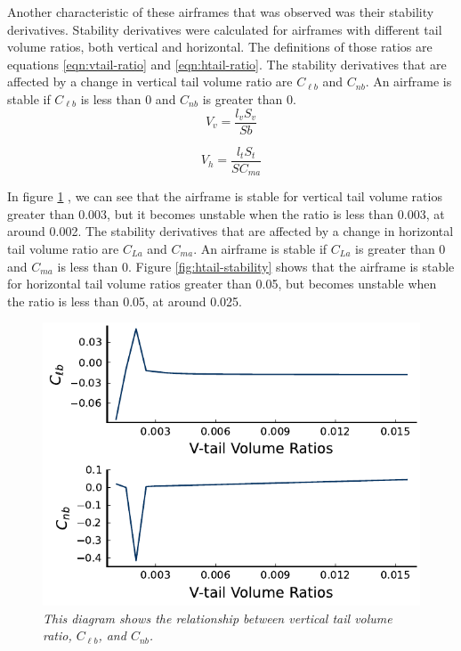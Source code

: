 \documentclass{journal}
\begin{document}
	Another characteristic of these airframes that was observed was their stability derivatives. Stability derivatives were calculated for airframes with different tail volume ratios, both vertical and horizontal. The definitions of those ratios are equations \ref{eqn:vtail-ratio} and \ref{eqn:htail-ratio}. The stability derivatives that are affected by a change in vertical tail volume ratio are \(C_{\ell{b}}\) and \(C_{nb}\). An airframe is stable if \(C_{\ell{b}}\) is less than 0 and \(C_{nb}\) is greater than 0. \\
	
	\begin{equation}
		V_v = \frac{l_vS_v}{Sb}
		\label{eqn:vtail-ratio}
	\end{equation}
	
	\begin{equation}
		V_h = \frac{l_tS_t}{SC_{ma}}
		\label{eqn:htail-ratio}
	\end{equation}

	In figure \ref{fig:vtail-stability} , we can see that the airframe is stable for vertical tail volume ratios greater than 0.003, but it becomes unstable when the ratio is less than 0.003, at around 0.002. The stability derivatives that are affected by a change in horizontal tail volume ratio are \(C_{La}\) and \(C_{ma}\). An airframe is stable if \(C_{La}\) is greater than 0 and \(C_{ma}\) is less than 0. Figure \ref{fig:htail-stability} shows that the airframe is stable for horizontal tail volume ratios greater than 0.05, but becomes unstable when the ratio is less than 0.05, at around 0.025. \\
	
	\begin{figure}[H]
		\centering
		\includegraphics[scale=0.73]{../graphics/vtail-stability.pdf}
		\caption{\emph{This diagram shows the relationship between vertical tail volume ratio, \(C_{\ell{b}}\), and \(C_{nb}\).}}
		\label{fig:vtail-stability}
	\end{figure}
\end{document}
